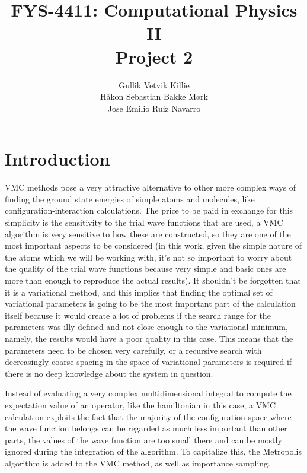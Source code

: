 \documentclass[11pt]{article}
\title{ FYS-4411: Computational Physics II \\ Project 2 }
\author{Gullik Vetvik Killie\\
		Håkon Sebastian Bakke Mørk\\
		Jose Emilio Ruiz Navarro
		}
\begin{document}
\maketitle



\section{Introduction}

VMC methods pose a very attractive alternative to other more complex ways of finding the ground state energies of simple atoms and molecules, like configuration-interaction calculations. The price to be paid in exchange for this simplicity is the sensitivity to the trial wave functions that are used, a VMC algorithm is very sensitive to how these are constructed, so they are one of the most important aspects to be considered (in this work, given the simple nature of the atoms which we will be working with, it's not so important to worry about the quality of the trial wave functions because very simple and basic ones are more than enough to reproduce the actual results). It shouldn't be forgotten that it is a variational method, and this implies that finding the optimal set of variational parameters is going to be the most important part of the calculation itself because it would create a lot of problems if the search range for the parameters was illy defined and not close enough to the variational minimum, namely, the results would have a poor quality in this case. This means that the parameters need to be chosen very carefully, or a recursive search with decreasingly coarse spacing in the space of variational parameters is required if there is no deep knowledge about the system in question.

Instead of evaluating a very complex multidimensional integral to compute the expectation value of an operator, like the hamiltonian in this case, a VMC calculation exploits the fact that the majority of the configuration space where the wave function belongs can be regarded as much less important than other parts, the values of the wave function are too small there and can be mostly ignored during the integration of the algorithm. To capitalize this, the Metropolis algorithm is added to the VMC method, as well as importance sampling.
\end{document}
